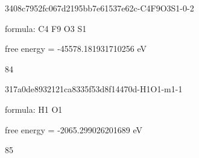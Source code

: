 \documentclass{article}
\begin{document}
\vspace{1cm}


3408c7952fc067d2195bb7e61537e62c-C4F9O3S1-0-2



formula: C4 F9 O3 S1



free energy = -45578.181931710256 eV

84

\vspace{1cm}


317a0de8932121ca8335f53d8f14470d-H1O1-m1-1



formula: H1 O1



free energy = -2065.299026201689 eV

85

\vspace{1cm}
\end{document}
